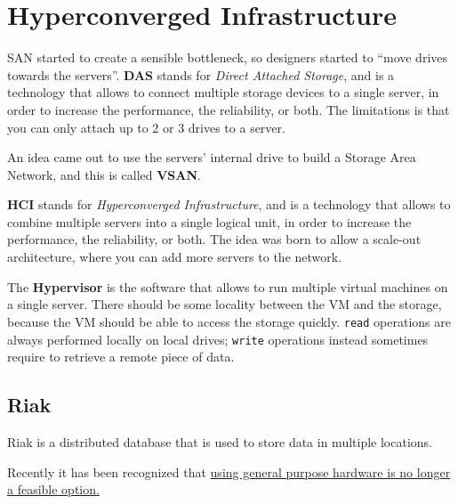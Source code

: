 \section{Hyperconverged Infrastructure}
SAN started to create a sensible bottleneck, so designers started to ``move drives towards the servers''.
\textbf{DAS} stands for \textit{Direct Attached Storage}, and is a technology that allows to connect multiple storage devices to a single server, in order to increase the performance, the reliability, or both.
The limitations is that you can only attach up to 2 or 3 drives to a server.

An idea came out to use the servers' internal drive to build a Storage Area Network, and this is called \textbf{VSAN}.

\textbf{HCI} stands for \textit{Hyperconverged Infrastructure}, and is a technology that allows to combine multiple servers into a single logical unit, in order to increase the performance, the reliability, or both. 
The idea was born to allow a scale-out architecture, where you can add more servers to the network.

The \textbf{Hypervisor} is the software that allows to run multiple virtual machines on a single server. There should be some locality between the VM and the storage, because the VM should be able to access the storage quickly.
\texttt{read} operations are always performed locally on local drives; \texttt{write} operations instead sometimes require to retrieve a remote piece of data.

\subsection{Riak}
Riak is a distributed database that is used to store data in multiple locations. 

Recently it has been recognized that \ul{using general purpose hardware is no longer a feasible option.}




